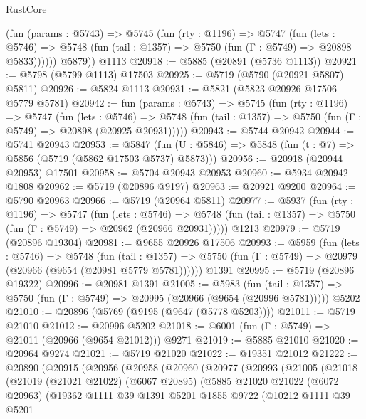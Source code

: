 \begin{lexlean}{RustCore}
\begin{coremodule}
          (fun (params : @5743) =>
          @5745
            (fun (rty : @1196) =>
            @5747
              (fun (lets : @5746) =>
              @5748 (fun (tail : @1357) => @5750 (fun (Γ : @5749) => @20898 @5833))))))
        @5879))
    @1113
@20918 := @5885 (@20891 (@5736 @1113))
@20921 := @5798 (@5799 @1113) @17503
@20925 := @5719 (@5790 (@20921 @5807) @5811)
@20926 := @5824 @1113
@20931 := @5821 (@5823 @20926 @17506 @5779 @5781)
@20942 := fun (params : @5743) =>
  @5745
    (fun (rty : @1196) =>
    @5747
      (fun (lets : @5746) =>
      @5748 (fun (tail : @1357) => @5750 (fun (Γ : @5749) => @20898 (@20925 @20931)))))
@20943 := @5744 @20942
@20944 := @5741 @20943
@20953 := @5847
    (fun (U : @5846) => @5848 (fun (t : @7) => @5856 (@5719 (@5862 @17503 @5737) @5873)))
@20956 := @20918 (@20944 @20953) @17501
@20958 := @5704 @20943 @20953
@20960 := @5934 @20942 @1808
@20962 := @5719 (@20896 @9197)
@20963 := @20921 @9200
@20964 := @5790 @20963
@20966 := @5719 (@20964 @5811)
@20977 := @5937
    (fun (rty : @1196) =>
    @5747
      (fun (lets : @5746) =>
      @5748 (fun (tail : @1357) => @5750 (fun (Γ : @5749) => @20962 (@20966 @20931)))))
    @1213
@20979 := @5719 (@20896 @19304)
@20981 := @9655 @20926 @17506
@20993 := @5959
    (fun (lets : @5746) =>
    @5748
      (fun (tail : @1357) =>
      @5750 (fun (Γ : @5749) => @20979 (@20966 (@9654 (@20981 @5779 @5781))))))
    @1391
@20995 := @5719 (@20896 @19322)
@20996 := @20981 @1391
@21005 := @5983
    (fun (tail : @1357) => @5750 (fun (Γ : @5749) => @20995 (@20966 (@9654 (@20996 @5781)))))
    @5202
@21010 := @20896 (@5769 (@9195 (@9647 (@5778 @5203))))
@21011 := @5719 @21010
@21012 := @20996 @5202
@21018 := @6001 (fun (Γ : @5749) => @21011 (@20966 (@9654 @21012))) @9271
@21019 := @5885 @21010
@21020 := @20964 @9274
@21021 := @5719 @21020
@21022 := @19351 @21012
@21222 := @20890
    (@20915
      (@20956
        (@20958
          (@20960
            (@20977
              (@20993
                (@21005
                  (@21018
                    (@21019
                      (@21021 @21022)
                      (@6067 @20895)
                      (@5885
                        @21020
                        @21022
                        (@6072 @20963)
                        (@19362
                          @1111
                          @39
                          @1391
                          @5201
                          @1855
                          @9722
                          (@10212
                            @1111
                            @39
                            @5201

\end{coremodule}
\end{lexlean}
